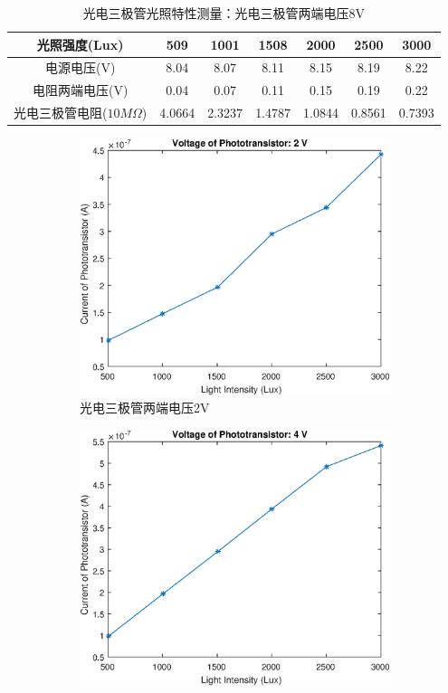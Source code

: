 \documentclass{ctexart}
\begin{document}
\begin{table}[H]
  \centering
  \begin{tabular}{|c|c|c|c|c|c|c|}
    \hline
    光照强度(Lux) &509&1001&1508&2000&2500&3000\\\hline
    电源电压(V) &8.04&8.07&8.11&8.15&8.19&8.22\\\hline
    电阻两端电压(V) &0.04&0.07&0.11&0.15&0.19&0.22\\\hline
    光电三极管电阻($10M\Omega$) &4.0664&2.3237&1.4787&1.0844&0.8561&0.7393 \\\hline
  \end{tabular}
  \caption{光电三极管光照特性测量：光电三极管两端电压8V}
\end{table}

\begin{figure}[H]
  \centering
  \begin{subfigure}{.45\textwidth}
    \centering
    \includegraphics[width=\linewidth]{光电传感器综合实验图像/phototransistor_2V}
    \caption{光电三极管两端电压2V}
  \end{subfigure}
  \begin{subfigure}{.45\textwidth}
    \centering
    \includegraphics[width=\linewidth]{光电传感器综合实验图像/phototransistor_4V}

\end{subfigure}
\end{figure}
\end{document}
